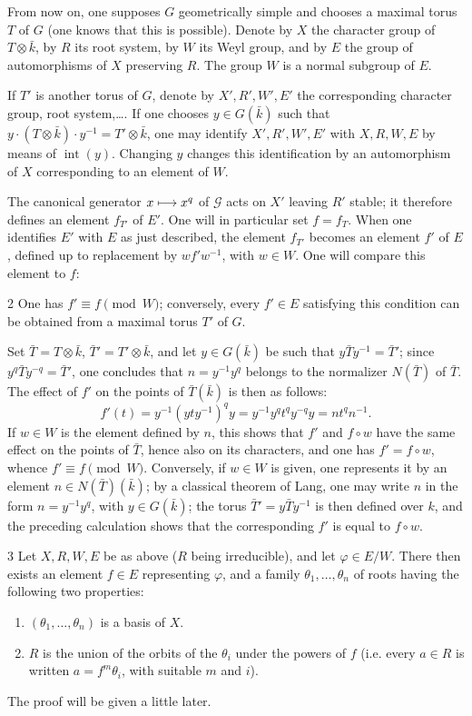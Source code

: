 From now on, one supposes $G$ geometrically simple and chooses
a maximal torus $T$ of $G$ (one knows that this is possible).
Denote by $X$ the character group of $T\otimes\bar k$,
by $R$ its root system, by $W$ its Weyl group, and by $E$
the group of automorphisms of $X$ preserving $R$. The group
$W$ is a normal subgroup of $E$.

If $T'$ is another torus of $G$, denote by $X',R',W',E'$
the corresponding character group, root system,\ldots.
If one chooses $y\in G(\bar k)$ such that
$y\cdot(T\otimes\bar k)\cdot y^{-1}=T'\otimes\bar k$,
one may identify $X',R',W',E'$ with $X,R,W,E$ by means
of $\operatorname{int}(y)$. Changing $y$ changes this
identification by an automorphism of $X$ corresponding
to an element of $W$.

The canonical generator $x\longmapsto x^q$ of $\mathscr G$
acts on $X'$ leaving $R'$ stable; it therefore defines
an element $f_{T'}$ of $E'$. One will in particular
set $f=f_T$. When one identifies $E'$ with $E$ as
just described, the element $f_{T'}$ becomes an
element $f'$ of $E$, defined up to replacement by
$wf'w^{-1}$, with $w\in W$. One will compare this
element to $f$:

\begin{lemma}{2}\label{XIV.2}
One has $f'\equiv f\pmod W$; conversely, every
$f'\in E$ satisfying this condition can be
obtained from a maximal torus $T'$ of $G$.
\end{lemma}
Set $\bar T=T\otimes\bar k$, $\bar T'=T'\otimes\bar k$,
and let $y\in G(\bar k)$ be such that
$y\bar Ty^{-1}=\bar T'$; since
$y^q\bar Ty^{-q}=\bar T'$, one concludes that
$n=y^{-1}y^q$ belongs to the normalizer
$N(\bar T)$ of $\bar T$. The effect of $f'$
on the points of $\bar T(\bar k)$ is then
as follows:
\[
 f'(t)=y^{-1}(yty^{-1})^qy
 =y^{-1}y^qt^qy^{-q}y=nt^qn^{-1}.
\]
If $w\in W$ is the element defined by
$n$, this shows that $f'$ and $f\circ w$
have the same effect on the points of
$\bar T$, hence also on its characters,
and one has $f'=f\circ w$, whence
$f'\equiv f\pmod W$. Conversely, if
$w\in W$ is given, one represents it
by an element $n\in N(\bar T)(\bar k)$;
by a classical theorem of Lang, one
may write $n$ in the form $n=y^{-1}y^q$,
with $y\in G(\bar k)$; the torus
$\bar T'=y\bar Ty^{-1}$ is then
defined over $k$, and the preceding
calculation shows that the corresponding
$f'$ is equal to $f\circ w$.

\begin{lemma}{3}\label{XIV.3}
Let $X,R,W,E$ be as above ($R$
being irreducible), and let
$\varphi\in E/W$. There then exists
an element $f\in E$ representing
$\varphi$, and a family
$\theta_1,\ldots,\theta_n$ of roots
having the following two properties:
\begin{enumerate}[label=\textup{(\arabic*)}]
\item $(\theta_1,\ldots,\theta_n)$ is a basis of $X$.
\item $R$ is the union of the orbits of the $\theta_i$
under the powers of $f$ (i.e. every $a\in R$ is
written $a=f^m\theta_i$, with suitable $m$ and $i$).
\end{enumerate}
\end{lemma}
The proof will be given a little later.

